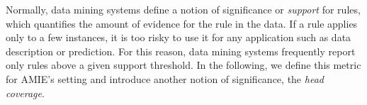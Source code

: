 Normally, data mining systems define a notion of significance or \emph{support} for rules, which quantifies the amount of evidence for the rule in the data.
If a rule applies only to a few instances, it is too risky to use it for any application such as data description or prediction. For this reason,
data mining systems frequently report only rules above a given support threshold. %
In the following, we define this metric for AMIE's setting and introduce another notion of significance, the \emph{head coverage}.

